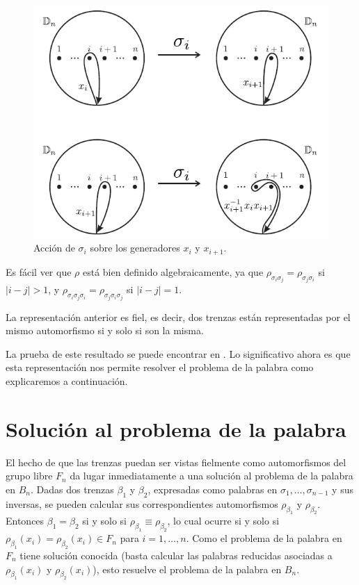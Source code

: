 \documentclass[TFG.tex]{subfiles}
\begin{document}
\begin{figure}[h!]
\includegraphics[scale=0.7]{Imagenes/auto.png}
\caption{Acción de $\sigma_i$ sobre los generadores $x_i$ y $x_{i+1}$.}\label{auto}
\end{figure}

Es fácil ver que $\rho$ está bien definido algebraicamente, ya que $\rho_{\sigma_i\sigma_j}=\rho_{\sigma_j\sigma_i}$ si $|i-j|>1$, y $\rho_{\sigma_i\sigma_j\sigma_i}=\rho_{\sigma_j\sigma_i\sigma_j}$ si $|i-j|=1$. 




\begin{teorema}
La representación anterior es fiel, es decir, dos trenzas están representadas por el mismo automorfismo si y solo si son la misma.
\end{teorema}

La prueba de este resultado se puede encontrar en \cite{Birman}. Lo significativo ahora es que esta representación nos permite resolver el problema de la palabra como explicaremos a continuación.

\newpage

\section{Solución al problema de la palabra}
El hecho de que las trenzas puedan ser vistas fielmente como automorfismos del grupo libre $F_n$ da lugar inmediatamente a una solución al problema de la palabra en $B_n$. Dadas dos trenzas $\beta_1$ y $\beta_2$, expresadas como palabras en $\sigma_1,\dots,\sigma_{n-1}$ y sus inversas, se pueden calcular sus correspondientes automorfismos $\rho_{\beta_1}$ y $\rho_{\beta_2}$. Entonces $\beta_1=\beta_2$ si y solo si $\rho_{\beta_1}\equiv \rho_{\beta_2}$, lo cual ocurre si y solo si $\rho_{\beta_1}(x_i)= \rho_{\beta_2}(x_i)\in F_n$ para $i=1,\dots, n$. Como el problema de la palabra en $F_n$ tiene solución conocida (basta calcular las palabras reducidas asociadas a $\rho_{\beta_1}(x_i)$ y $\rho_{\beta_2}(x_i)$), esto resuelve el problema de la palabra en $B_n$. 
\end{document}
